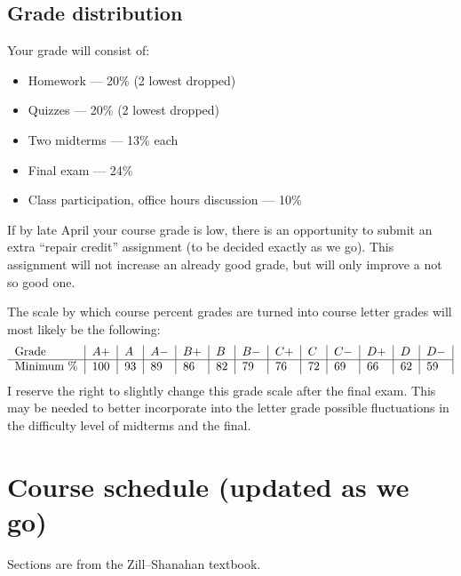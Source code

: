 \documentclass[oneside,11pt]{amsart}
\begin{document}
\subsection{Grade distribution}

Your grade will consist of:
\begin{itemize}
	\item Homework --- 20\% (2 lowest dropped)
	\item Quizzes --- 20\% (2 lowest dropped)
	\item Two midterms --- 13\% each
	\item Final exam --- 24\%
	\item Class participation, office hours discussion --- 10\%
\end{itemize}
If by late April your course grade is low, there is an opportunity to submit an extra
``repair credit'' assignment (to be decided exactly as we go). This assignment will not 
increase an already good grade, but will only improve a not so good one.

The scale by which course percent grades are turned into course letter grades
will most likely be the following:
\begin{equation*}
	\begin{tabular}{l|l|l|l|l|l|l|l|l|l|l|l|l|}
		Grade      & $ A+	$ & $A	$ & $A-	$ & $B+	$ & $B	$ & $B-	$ & $C+	$ & $C	$ & $C-	$ & $D+	$ & $D	$ & $D-$ \\
		\hline
		Minimum \% & 100     & 93   & 89    & 86    & 82    & 79    & 76    & 72    & 69    & 66    & 62    & 59
	\end{tabular}
\end{equation*}
I reserve the right to slightly change this grade scale after the
final exam.
This may be needed
to better incorporate into the letter grade
possible fluctuations in the difficulty level of 
midterms and the final.

\section{Course schedule (updated as we go)}
\label{sec:schedule}

Sections are from the Zill--Shanahan textbook.
\end{document}
